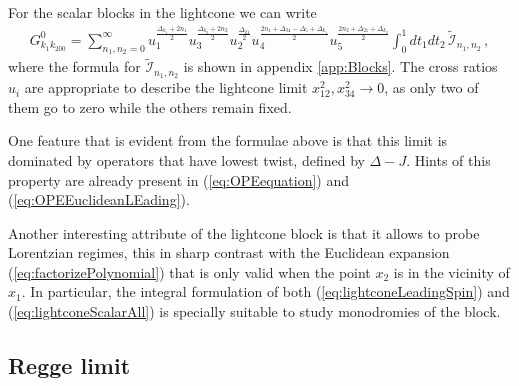 For the scalar blocks in the  lightcone  we can write %
\begin{align}
  G_{k_1k_200}^{0} = \sum_{n_1,n_2=0}^{\infty} u_1^{\frac{\Delta_{k_1}+2n_1}{2}} u_3^{\frac{\Delta_{k_2}+2n_2}{2}} u_{2}^{\frac{\Delta_{21}}{2}}u_4^{\frac{2n_1+\Delta_{34}-\Delta_5+\Delta_{k_1}}{2}}u_5^{\frac{2n_2+\Delta_{21}+\Delta_{k_2} }{2}}\int_{0}^{1}dt_1dt_2  \, \tilde{\mathcal{I}}_{n_1,n_2}\,,
  \label{eq:scalarblockslightcone}
\end{align}
where the formula for $\tilde{\mathcal{I}}_{n_1,n_2}$ is shown in appendix \ref{app:Blocks}. The cross ratios $u_i$ are appropriate to describe the lightcone limit $x_{12}^2, x_{34}^2\rightarrow 0$, as only two of them go
to zero while the others remain fixed.

One feature that is evident from the formulae above is that this limit is dominated by operators that have lowest twist, defined by $\Delta-J$. Hints of this property are already present in (\ref{eq:OPEequation}) and (\ref{eq:OPEEuclideanLEading}).

Another interesting attribute of the lightcone block is that it allows to probe Lorentzian regimes, this in sharp contrast with the Euclidean expansion (\ref{eq:factorizePolynomial}) that is only valid when the point $x_2$ is in the vicinity of $x_1$. In particular, the integral formulation of both (\ref{eq:lightconeLeadingSpin}) and (\ref{eq:lightconeScalarAll}) is specially suitable to study  monodromies of the block.


\subsection{Regge limit}
\label{sec:Regge_limit}



